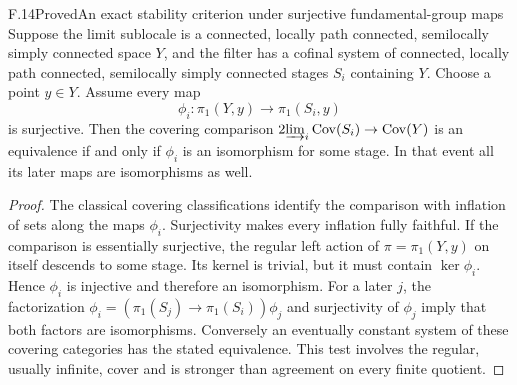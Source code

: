 \begin{statement}{F.14}{Proved}{An exact stability criterion under surjective fundamental-group maps}
Suppose the limit sublocale is a connected, locally path connected,
semilocally simply connected space $Y$, and the filter has a cofinal
system of connected, locally path connected, semilocally simply
connected stages $S_i$ containing $Y$. Choose a point $y\in Y$.
Assume every map
\[
 \phi_i:\pi_1(Y,y)\longrightarrow\pi_1(S_i,y)
\]
is surjective. Then the covering comparison
$\operatorname*{2\!\varinjlim}_i\operatorname{Cov}(S_i)
\to\operatorname{Cov}(Y)$ is an equivalence if and only if
$\phi_i$ is an isomorphism for some stage. In that event all its
later maps are isomorphisms as well.
\end{statement}
\begin{proof}
The classical covering classifications identify the comparison with
inflation of sets along the maps $\phi_i$. Surjectivity makes every
inflation fully faithful. If the comparison is essentially surjective,
the regular left action of $\pi=\pi_1(Y,y)$ on itself descends to
some stage. Its kernel is trivial, but it must contain
$\ker\phi_i$. Hence $\phi_i$ is injective and therefore an
isomorphism. For a later $j$, the factorization
$\phi_i=(\pi_1(S_j)\to\pi_1(S_i))\phi_j$ and surjectivity of
$\phi_j$ imply that both factors are isomorphisms. Conversely an
eventually constant system of these covering categories has the
stated equivalence. This test involves the regular, usually infinite,
cover and is stronger than agreement on every finite quotient.
\end{proof}

